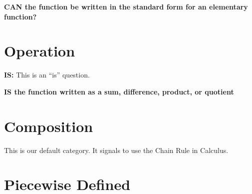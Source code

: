 \documentclass{ximera}
\begin{document}
\begin{center}
\textbf{\textcolor{red!80!black}{CAN the function be written in the standard form for an elementary function?}}

\end{center}

















\section{Operation}




\textbf{\textcolor{purple!85!blue}{IS:}}   This is an ``is'' question. \\

\begin{center}
\textbf{\textcolor{red!80!black}{IS the function written as a sum, difference, product, or quotient}}

\end{center}






















\section{Composition}




This is our default category.  It signals to use the Chain Rule in Calculus. \\
















\section{Piecewise Defined}
\end{document}
